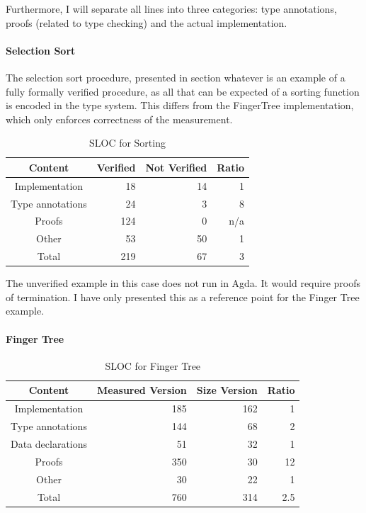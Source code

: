 \documentclass[12pt,twoside,notitlepage]{report}
\begin{document}
Furthermore, I will separate all lines into three categories: type annotations, proofs (related to type checking) and the actual implementation.

\paragraph{Selection Sort}

The selection sort procedure, presented in section whatever is an example of a fully formally verified procedure, as all that can be expected of a sorting function is encoded in the type system. This differs from the FingerTree implementation, which only enforces correctness of the measurement.

\begin{table}[H]
\caption{SLOC for Sorting}
\center
\begin{tabular}{c r r r}
\hline
Content & Verified & Not Verified & Ratio\\
\hline
Implementation & 18 & 14 & 1\\
Type annotations & 24 & 3 & 8\\
Proofs & 124 & 0 & n/a\\
Other & 53 & 50 & 1\\
Total & 219 & 67 & 3\\
\hline
\end{tabular} 
\end{table}

The unverified example in this case does not run in Agda. It would require proofs of termination. I have only presented this as a reference point for the Finger Tree example.

\paragraph{Finger Tree}

\begin{table}[H]
\caption{SLOC for Finger Tree}
\center
\begin{tabular}{c r r r}
\hline 
Content & Measured Version & Size Version & Ratio \\
\hline
Implementation & 185 & 162 & 1 \\ 
Type annotations & 144 & 68 & 2 \\
Data declarations & 51 & 32 &  1 \\
Proofs & 350 & 30 & 12 \\
Other & 30 & 22 & 1 \\ 
Total & 760 & 314 & 2.5 \\
\hline
\end{tabular}
\end{table} 
\end{document}
